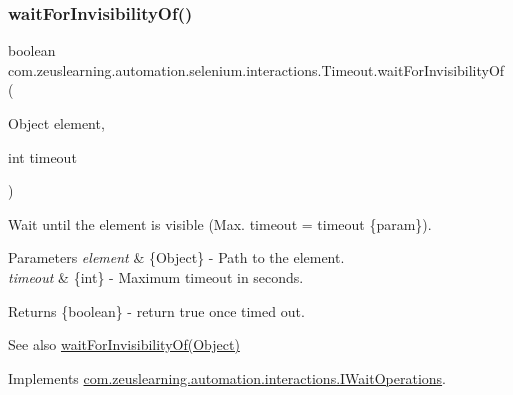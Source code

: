 \subsubsection{\texorpdfstring{wait\+For\+Invisibility\+Of()}{waitForInvisibilityOf()}\hspace{0.1cm}{\footnotesize\ttfamily [2/2]}}
{\footnotesize\ttfamily boolean com.\+zeuslearning.\+automation.\+selenium.\+interactions.\+Timeout.\+wait\+For\+Invisibility\+Of (\begin{DoxyParamCaption}\item[{Object}]{element,  }\item[{int}]{timeout }\end{DoxyParamCaption})\hspace{0.3cm}{\ttfamily [inline]}}

Wait until the element is visible (Max. timeout = timeout \{param\}).


\begin{DoxyParams}{Parameters}
{\em element} & \{Object\} -\/ Path to the element. \\
\hline
{\em timeout} & \{int\} -\/ Maximum timeout in seconds.\\
\hline
\end{DoxyParams}
\begin{DoxyReturn}{Returns}
\{boolean\} -\/ return {\ttfamily true} once timed out.
\end{DoxyReturn}
\begin{DoxySeeAlso}{See also}
\hyperlink{classcom_1_1zeuslearning_1_1automation_1_1selenium_1_1interactions_1_1Timeout_adefb45ce06aba9bedc30a707f41ebe3f}{wait\+For\+Invisibility\+Of(\+Object)} 
\end{DoxySeeAlso}


Implements \hyperlink{interfacecom_1_1zeuslearning_1_1automation_1_1interactions_1_1IWaitOperations_a816b3d7ef80895d1cf54cc657a10204e}{com.\+zeuslearning.\+automation.\+interactions.\+I\+Wait\+Operations}.

\hypertarget{classcom_1_1zeuslearning_1_1automation_1_1selenium_1_1interactions_1_1Timeout_a82895e2aaa48ce6d3d8fecd0d2042db6}{}\label{classcom_1_1zeuslearning_1_1automation_1_1selenium_1_1interactions_1_1Timeout_a82895e2aaa48ce6d3d8fecd0d2042db6} 
